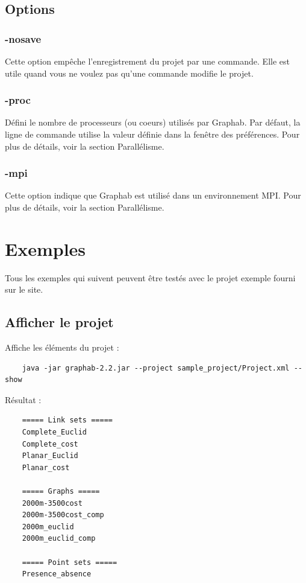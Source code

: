 \documentclass[a4paper,10pt]{report}
\begin{document}
\section{Options}
\subsection{-nosave}
Cette option empêche l'enregistrement du projet par une commande.
Elle est utile quand vous ne voulez pas qu'une commande modifie le projet.

\subsection{-proc}
Défini le nombre de processeurs (ou coeurs) utilisés par Graphab.
Par défaut, la ligne de commande utilise la valeur définie dans la fenêtre des préférences.
Pour plus de détails, voir la section Parallélisme.

\subsection{-mpi}
Cette option indique que Graphab est utilisé dans un environnement MPI. Pour plus de détails, voir la section Parallélisme.


\chapter{Exemples}
Tous les exemples qui suivent peuvent être testés avec le projet exemple fourni sur le site.

\section{Afficher le projet}
Affiche les éléments du projet :
\begin{Verbatim}
	java -jar graphab-2.2.jar --project sample_project/Project.xml --show
\end{Verbatim}
Résultat :
\begin{Verbatim}
	===== Link sets =====
	Complete_Euclid
	Complete_cost
	Planar_Euclid
	Planar_cost
	
	===== Graphs =====
	2000m-3500cost
	2000m-3500cost_comp
	2000m_euclid
	2000m_euclid_comp
	
	===== Point sets =====
	Presence_absence
\end{Verbatim}
\end{document}
